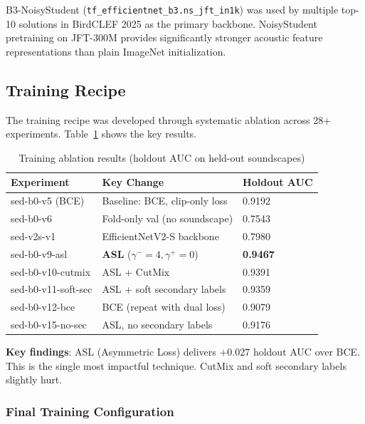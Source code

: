 \documentclass[11pt,a4paper]{article}
\begin{document}
\noindent B3-NoisyStudent (\texttt{tf\_efficientnet\_b3.ns\_jft\_in1k}) was used by multiple
top-10 solutions in BirdCLEF 2025 as the primary backbone. NoisyStudent pretraining on
JFT-300M provides significantly stronger acoustic feature representations than plain
ImageNet initialization.

\subsection{Training Recipe}
\label{sec:recipe}

The training recipe was developed through systematic ablation across 28+ experiments.
Table~\ref{tab:ablation} shows the key results.

\begin{table}[H]
\centering
\caption{Training ablation results (holdout AUC on held-out soundscapes)}
\label{tab:ablation}
\begin{tabular}{lll}
\toprule
\textbf{Experiment} & \textbf{Key Change} & \textbf{Holdout AUC} \\
\midrule
sed-b0-v5 (BCE)       & Baseline: BCE, clip-only loss         & 0.9192 \\
sed-b0-v6             & Fold-only val (no soundscape)         & 0.7543 \\
sed-v2s-v1            & EfficientNetV2-S backbone             & 0.7980 \\
sed-b0-v9-asl         & \textbf{ASL} ($\gamma^-=4, \gamma^+=0$) & \textbf{0.9467} \\
sed-b0-v10-cutmix     & ASL + CutMix                          & 0.9391 \\
sed-b0-v11-soft-sec   & ASL + soft secondary labels           & 0.9359 \\
sed-b0-v12-bce        & BCE (repeat with dual loss)           & 0.9079 \\
sed-b0-v15-no-sec     & ASL, no secondary labels              & 0.9176 \\
\bottomrule
\end{tabular}
\end{table}

\noindent\textbf{Key findings}: ASL (Asymmetric Loss) delivers $+0.027$ holdout AUC over BCE.
This is the single most impactful technique. CutMix and soft secondary labels slightly hurt.

\subsubsection{Final Training Configuration}
\end{document}
